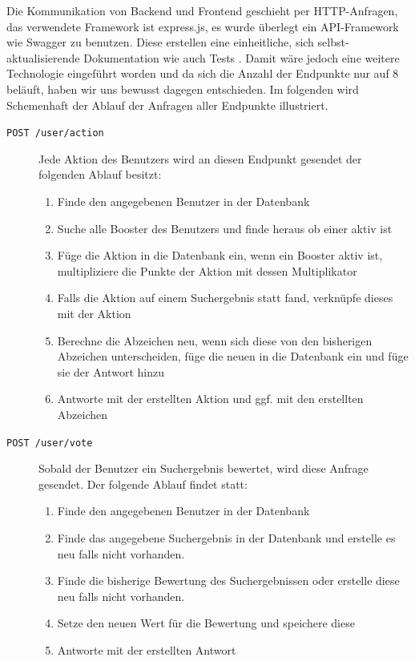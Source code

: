 \documentclass[12pt,twoside]{book}
\begin{document}
Die Kommunikation von Backend und Frontend geschieht per HTTP-Anfragen, das verwendete Framework ist express.js, es wurde überlegt ein API-Framework wie Swagger zu benutzen. Diese erstellen eine einheitliche, sich selbst-aktualisierende Dokumentation wie auch Tests \cite{haupt2014model}.
Damit wäre jedoch eine weitere Technologie eingeführt worden und da sich die Anzahl der Endpunkte nur auf 8 beläuft, haben wir uns bewusst dagegen entschieden. Im folgenden wird Schemenhaft der Ablauf der Anfragen aller Endpunkte illustriert.

\begin{description}
	\item[\texttt{POST  /user/action}] Jede Aktion des Benutzers wird an diesen Endpunkt gesendet der folgenden Ablauf besitzt:
	\begin{enumerate}
		\item Finde den angegebenen Benutzer in der Datenbank
		\item Suche alle Booster des Benutzers und finde heraus ob einer aktiv ist
		\item Füge die Aktion in die Datenbank ein, wenn ein Booster aktiv ist, multipliziere die Punkte der Aktion mit dessen Multiplikator
		\item Falls die Aktion auf einem Suchergebnis statt fand, verknüpfe dieses mit der Aktion
		\item Berechne die Abzeichen neu, wenn sich diese von den bisherigen Abzeichen unterscheiden, füge die neuen in die Datenbank ein und füge sie der Antwort hinzu
		\item Antworte mit der erstellten Aktion und ggf. mit den erstellten Abzeichen
	\end{enumerate}
	\item[\texttt{POST /user/vote}] Sobald der Benutzer ein Suchergebnis bewertet, wird diese Anfrage gesendet. Der folgende Ablauf findet statt:
	\begin{enumerate}
		\item Finde den angegebenen Benutzer in der Datenbank
		\item Finde das angegebene Suchergebnis in der Datenbank und erstelle es neu falls nicht vorhanden.
		\item Finde die bisherige Bewertung des Suchergebnissen oder erstelle diese neu falls nicht vorhanden.
		\item Setze den neuen Wert für die Bewertung und speichere diese
		\item Antworte mit der erstellten Antwort
	\end{enumerate}

\end{description}
\end{document}
